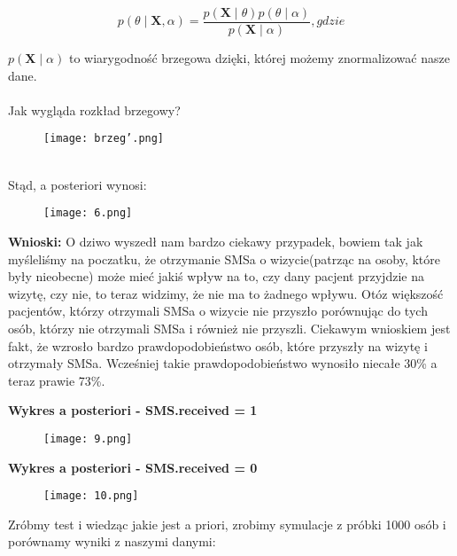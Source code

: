 \documentclass[12pt]{article}
\begin{document}
$$p(\theta \mid \mathbf{X}, \alpha) = \frac{p(\mathbf{X} \mid \theta) p(\theta \mid \alpha) }{p(\mathbf{X} \mid \alpha)}, gdzie$$

$p(\mathbf{X} \mid \alpha)$ to wiarygodność brzegowa dzięki, której możemy znormalizować nasze dane.
\\
\bigskip
\\
Jak wygląda rozkład brzegowy?
\begin{flushright}
\begin{figure}[ht!]
\texttt{[image: brzeg'.png]}
\label{fig:2}
\end{figure}
\end{flushright}
\\
Stąd, a posteriori wynosi:
\begin{flushright}
\begin{figure}[ht!]
\texttt{[image: 6.png]}
\label{fig:2}
\end{figure}
\end{flushright}
\textbf{Wnioski:}
O dziwo wyszedł nam bardzo ciekawy przypadek, bowiem tak jak myśleliśmy na poczatku, że otrzymanie SMSa o wizycie(patrząc na osoby, które były nieobecne) może mieć jakiś wpływ na to, czy dany pacjent przyjdzie na wizytę, czy nie, to teraz widzimy, że nie ma to żadnego wpływu. Otóz większość pacjentów, którzy otrzymali SMSa o wizycie nie przyszło porównując do tych osób, którzy nie otrzymali SMSa i również nie przyszli. Ciekawym wnioskiem jest fakt, że wzrosło bardzo prawdopodobieństwo osób, które przyszły na wizytę i otrzymały SMSa. Wcześniej takie prawdopodobieństwo wynosiło niecałe 30\% a teraz prawie 73\%.
\bigskip
\\

\newpage
\begin{center}
\textbf{Wykres a posteriori - SMS.received = 1}
\end{center}
\begin{figure}[ht!]
\begin{center}
\texttt{[image: 9.png]}
\label{fig:2}
\end{center}
\end{figure}

\begin{center}
\textbf{Wykres a posteriori - SMS.received = 0}
\end{center}
\begin{figure}[ht!]
\begin{center}
\texttt{[image: 10.png]}
\label{fig:2}
\end{center}
\end{figure}
\newpage
Zróbmy test i wiedząc jakie jest a priori, zrobimy symulacje z próbki 1000 osób i porównamy wyniki z naszymi danymi:
\end{document}
